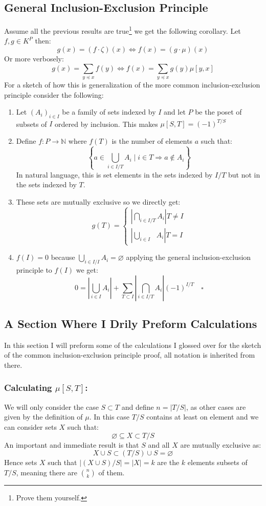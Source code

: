 \subsection{General Inclusion-Exclusion Principle}
Assume all the previous results are true\footnote{Prove them yourself.} we get the following corollary.
Let $f,g\in K^P$ then:
\[g(x) = (f\cdot \zeta)(x) \Leftrightarrow f(x) = (g\cdot \mu)(x)\]
Or more verbosely:
\[g(x) = \sum_{y\preceq x}f(y) \Leftrightarrow f(x) = \sum_{y\preceq x}g(y)\mu[y,x]\]
For a sketch of how this is generalization of the more common inclusion-exclusion principle consider the following:
\begin{enumerate}
	\item Let $(A_i)_{i\in I}$ be a family of sets indexed by $I$ and let $P$ be the poset of subsets of $I$ ordered by inclusion.
	This makes $\mu[S,T] = (-1)^{T/S}$
	\item Define $f:P\rightarrow \mathbb{N}$ where $f(T)$ is the number of elements $a$ such that:
		\[\left\{a \in \bigcup_{i\in I/T}A_i \mid i\in T \Rightarrow a\not\in A_i \right\}\]
	In natural language, this is set elements in the sets indexed by $I/T$ but not in the sets indexed by $T$.
	\item These sets are mutually exclusive so we directly get:
		\[g(T)=\begin{cases}\left|\bigcap_{i\in I/T}A_i\right| T\neq I\\\left|\bigcup_{i\in I\phantom{/I}}A_i\right|T=I\end{cases}\]
	\item $f(I)=0$ because $\bigcup_{i\in I/I}A_i = \varnothing$ applying the general inclusion-exclusion principle to $f(I)$ we get: 
		\[0=\left|\bigcup_{i\in I}A_i\right|+\sum_{T\subset I}\left|\bigcap_{i\in I/T}A_i\right|(-1)^{I/T}\quad\square\]
\end{enumerate}

\subsection{A Section Where I Drily Preform Calculations}
In this section I will preform some of the calculations I glossed over for the sketch of the common inclusion-exclusion principle proof,
all notation is inherited from there.

\subsubsection{Calculating $\mu[S,T]$:}
We will only consider the case $S\subset T$ and define $n=|T/S|$,
as other cases are given by the definition of $\mu$.
In this case $T/S$ contains at least on element and we can consider sets $X$ such that:
\[\varnothing\subseteq X\subset T/S\]
An important and immediate result is that $S$ and all $X$ are mutually exclusive as:
\[X\cup S \subset (T/S)\cup S = \varnothing\]
Hence sets $X$ such that $|(X\cup S)/S|=|X|=k$ are the $k$ elements subsets of $T/S$,
meaning there are $\binom{n}{k}$ of them.
\\

